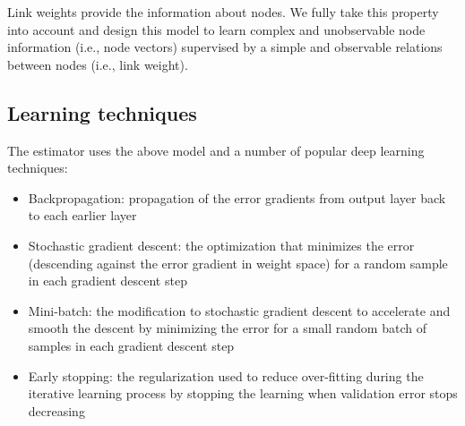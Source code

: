 \documentclass[conference]{IEEEtran}
\begin{document}
Link weights provide the information about nodes.
We fully take this property into account and design this model to learn 
complex and unobservable node information (i.e., node vectors) 
supervised by a simple and observable relations between nodes (i.e., link weight).

\subsection{Learning techniques}
The estimator uses the above model and a number of popular deep learning 
techniques:
\begin{itemize}
	\item Backpropagation: propagation of the error gradients from output layer 
	back to each earlier layer \cite{rumelhart1988learning}
	\item Stochastic gradient descent: the optimization that minimizes 
	the error (descending against the error gradient in weight space) for a 
	random sample in each gradient descent step \cite{lecun2012efficient}
	\item Mini-batch: the modification to stochastic gradient descent to 
	accelerate and smooth the descent by minimizing the error for a small 
	random batch of samples in each gradient descent step \cite{mairal2010online}
	\item Early stopping: the regularization used to reduce over-fitting during the iterative learning process by stopping the learning when validation error stops decreasing \cite{smale2007learning}
\end{itemize}
\end{document}
